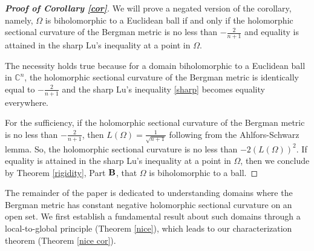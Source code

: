 \documentclass[12pt] {article}
\numberwithin{equation}{section}
\begin{document}
 




 \medskip


  \begin{proof} [{\bf Proof of Corollary \ref{cor}}]
  
We will prove a negated version of the corollary, namely,
$\Omega$ is biholomorphic to a Euclidean ball if and only if the holomorphic sectional curvature of the Bergman metric is no less than  $-\frac{2}{n+1}$ and equality is attained in the sharp Lu's inequality at a point in $\Omega$.

 \medskip



The necessity holds true because for a domain 
biholomorphic to a Euclidean ball in $\mathbb{C}^n$, the 
holomorphic sectional curvature of the Bergman metric is identically equal to  $-\frac{2}{n+1}$
and  the sharp Lu's inequality \eqref{sharp} becomes equality everywhere.


\medskip

For the sufficiency, if the holomorphic sectional curvature of the Bergman metric is no less than  $-\frac{2}{n+1}$, then  \(L(\Omega) = \frac{1}{\sqrt{n+1}}\) following from the Ahlfors-Schwarz lemma. So, the holomorphic sectional curvature is no less than $-2(L(\Omega))^2$. If equality is attained in the sharp Lu's inequality at a point in $\Omega$, then  we conclude by Theorem \ref{rigidity}, Part {$\bf B$}, that $\Omega$ is biholomorphic to a  ball.


\end{proof}



\medskip


 
 
 The remainder of the paper is dedicated to understanding domains where the Bergman metric has constant negative holomorphic sectional curvature on an open set. We first establish a fundamental result about such domains through a local-to-global principle (Theorem \ref{nice}), which leads to our characterization theorem (Theorem \ref{nice cor}).
  
   
    \medskip
 
\end{document}
